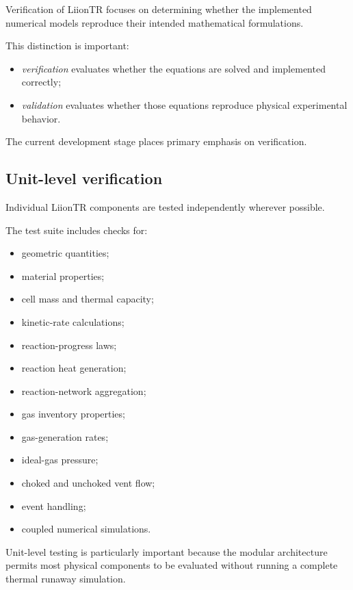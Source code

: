 Verification of LiionTR focuses on determining whether the implemented
numerical models reproduce their intended mathematical formulations.

This distinction is important:

\begin{itemize}
    \item \emph{verification} evaluates whether the equations are solved
          and implemented correctly;
    \item \emph{validation} evaluates whether those equations reproduce
          physical experimental behavior.
\end{itemize}

The current development stage places primary emphasis on verification.


\subsection{Unit-level verification}

Individual LiionTR components are tested independently wherever
possible.

The test suite includes checks for:

\begin{itemize}
    \item geometric quantities;
    \item material properties;
    \item cell mass and thermal capacity;
    \item kinetic-rate calculations;
    \item reaction-progress laws;
    \item reaction heat generation;
    \item reaction-network aggregation;
    \item gas inventory properties;
    \item gas-generation rates;
    \item ideal-gas pressure;
    \item choked and unchoked vent flow;
    \item event handling;
    \item coupled numerical simulations.
\end{itemize}

Unit-level testing is particularly important because the modular
architecture permits most physical components to be evaluated without
running a complete thermal runaway simulation.


